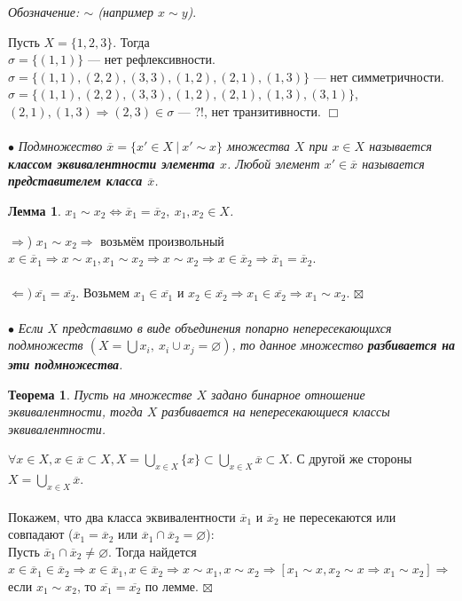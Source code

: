\documentclass[a4paper, 12pt]{report}
\newenvironment{Proof} %
{\par\noindent{$\blacklozenge$}} %
{\hfill$\scriptstyle\boxtimes$}
\newenvironment{examp} %
{\par\noindent{\textbf{\textsc{Пример:}}}} %
{\hfill$\scriptstyle\Box$}
\begin{document}
	\textit{Обозначение: $\sim$ (например $x\sim y$)}.\\
	\begin{examp}
	Пусть $X = \{1,2,3\}$. Тогда\\
	$\sigma = \{(1,1)\}$ --- нет рефлексивности.\\
	$\sigma = \{(1,1), (2,2), (3,3), (1,2), (2,1), (1,3)\}$ --- нет симметричности.\\
	$\sigma = \{(1,1), (2,2), (3,3), (1,2), (2,1), (1,3), (3,1)\}$, $(2,1), (1,3) \Rightarrow (2,3) \in \sigma$ --- ?!, нет транзитивности.
	\end{examp}\\\\
	$\bullet$ \textit{Подмножество $\overline{x} = \{ x' \in X\ |\ x' \sim x\}$ множества $X$ при $x\in X$ называется \textbf{классом эквивалентности элемента $x$}. Любой элемент $x'\in \overline{x}$ называется \textbf{представителем класса $\overline{x}$}.}
	\newtheorem*{lem25_1}{Лемма}\begin{lem25_1}$x_1 \sim x_2 \Longleftrightarrow \overline{x}_1 = \overline{x}_2,\ x_1, x_2\in X$.\end{lem25_1}
	\begin{Proof}
		$\Rightarrow$) $x_1\sim x_2\Rightarrow $  возьмём произвольный $x \in \overline{x}_1\Rightarrow x\sim x_1, x_1\sim x_2 \Rightarrow x \sim x_2 \Rightarrow x\in \overline{x}_2 \Rightarrow \overline{x}_1 = \overline{x}_2$.\\\\
		$\Leftarrow)\ \overline{x_1} = \overline{x_2}.$ Возьмем $x_1 \in \overline{x_1}$ и $x_2\in \overline{x_2}\Rightarrow x_1 \in \overline{x_2}\Rightarrow x_1 \sim x_2$.
	\end{Proof}\\\\
	$\bullet$ \textit{Если $X$ представимо в виде объединения попарно непересекающихся подмножеств $(X = \bigcup x_i,\ x_i\cup x_j = \varnothing)$, то данное множество \textbf{разбивается на эти подмножества}.}
	\newtheorem*{th25_1}{Теорема}\begin{th25_1}Пусть на множестве $X$ задано бинарное отношение эквивалентности, тогда $X$ разбивается на непересекающиеся классы
		эквивалентности.
	\end{th25_1}
	\begin{Proof}
		$\forall x \in X, x \in \overline{x}\subset X, X = \bigcup\limits_{x\in X}\{x\}\subset \bigcup\limits_{x\in X}\overline{x}\subset X$. С другой же стороны $X = \bigcup\limits_{x\in X}\overline{x}$.\\\\
		Покажем, что два класса эквивалентности $\overline{x}_1$ и $\overline{x}_2$ не пересекаются или совпадают ($\overline{x}_1 = \overline{x}_2$ или $\overline{x}_1\cap \overline{x}_2 = \varnothing$):\\
		Пусть $\overline{x}_1\cap \overline{x}_2 \ne \varnothing$. Тогда найдется $x \in \overline{x}_1 \in \overline{x}_2\Rightarrow x\in \overline{x}_1, x\in \overline{x}_2\Rightarrow x\sim x_1, x\sim x_2 \Rightarrow [x_1\sim x, x_2\sim x\Rightarrow x_1\sim x_2]\Rightarrow$ если $x_1 \sim x_2$, то $\overline{x_1} = \overline{x_2}$ по лемме.
	\end{Proof}\\\\
\end{document}
